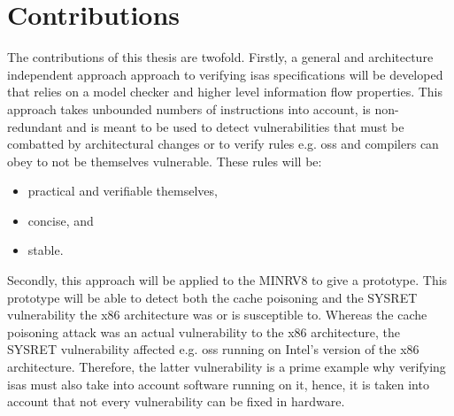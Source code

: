 \section{Contributions}

The contributions of this thesis are twofold.
Firstly, a general and architecture independent approach approach to verifying \glspl{isa} specifications will be developed that relies on a model checker and higher level information flow properties.
This approach takes unbounded numbers of instructions into account, is non-redundant and is meant to be used to detect vulnerabilities that must be combatted by architectural changes or to verify rules e.g. \glspl{os} and compilers can obey to not be themselves vulnerable.
These rules will be:
\begin{itemize}
    \item practical and verifiable themselves,
    \item concise, and
    \item stable.
\end{itemize}

Secondly, this approach will be applied to the MINRV8 to give a prototype.
This prototype will be able to detect both the cache poisoning and the SYSRET vulnerability the x86 architecture was or is susceptible to.
Whereas the cache poisoning attack was an actual vulnerability to the x86 architecture, the SYSRET vulnerability affected e.g. \glspl{os} running on Intel's version of the x86 architecture.
Therefore, the latter vulnerability is a prime example why verifying \glspl{isa} must also take into account software running on it, hence, it is taken into account that not every vulnerability can be fixed in hardware.
